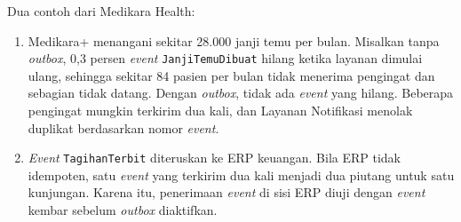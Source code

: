 Dua contoh dari Medikara Health:
\begin{enumerate}
  \item Medikara+ menangani sekitar 28.000 janji temu per bulan. Misalkan tanpa \textit{outbox},
        0,3 persen \textit{event} \texttt{JanjiTemuDibuat} hilang ketika layanan dimulai ulang,
        sehingga sekitar 84 pasien per bulan tidak menerima pengingat dan sebagian tidak datang.
        Dengan \textit{outbox}, tidak ada \textit{event} yang hilang. Beberapa pengingat mungkin
        terkirim dua kali, dan Layanan Notifikasi menolak duplikat berdasarkan nomor
        \textit{event}.
  \item \textit{Event} \texttt{TagihanTerbit} diteruskan ke ERP keuangan. Bila ERP tidak idempoten,
        satu \textit{event} yang terkirim dua kali menjadi dua piutang untuk satu kunjungan. Karena
        itu, penerimaan \textit{event} di sisi ERP diuji dengan \textit{event} kembar sebelum
        \textit{outbox} diaktifkan.
\end{enumerate}

